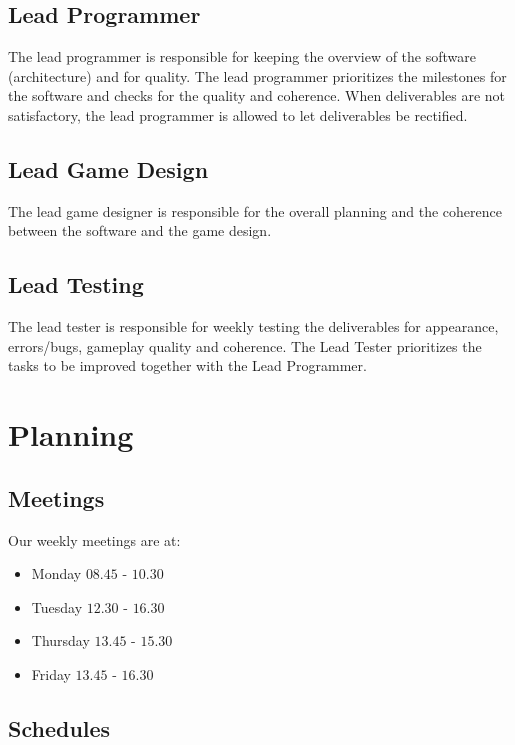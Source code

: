\documentclass[a4paper,11pt,notitlepage]{report}
\begin{document}
\subsection{Lead Programmer}
The lead programmer is responsible for keeping the overview of the software (architecture) and for quality. The lead programmer prioritizes the milestones for the software and checks for the quality and coherence. When deliverables are not satisfactory, the lead programmer is allowed to let deliverables be rectified.

\subsection{Lead Game Design}
The lead game designer is responsible for the overall planning and the coherence between the software and the game design. 

\subsection{Lead Testing}
The lead tester is responsible for weekly testing the deliverables for appearance, errors/bugs, gameplay quality and coherence. The Lead Tester prioritizes the tasks to be improved together with the Lead Programmer. 

\section{Planning}

\subsection{Meetings}
Our weekly meetings are at:
\begin{itemize}
	\item Monday $08.45$ - $10.30$
	\item Tuesday $12.30$ - $16.30$
	\item Thursday $13.45$ - $15.30$
	\item Friday $13.45$ - $16.30$
\end{itemize}

\subsection{Schedules}
\end{document}
